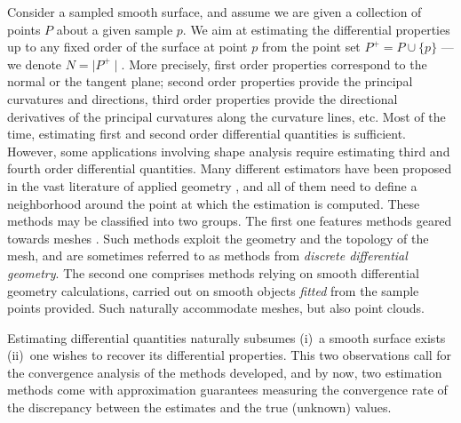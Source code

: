 Consider a sampled smooth surface, and assume we are given a
collection of points $P$ about a given sample $p$. We aim at
estimating the differential properties up to any fixed order of the
surface at point $p$ from the point set $P^+ = P\cup \{ p\}$ ---we
denote $N=\mid P^+\mid$. More precisely, first order properties
correspond to the normal or the tangent plane; second order properties
provide the principal curvatures and directions, third order
properties provide the directional derivatives of the principal
curvatures along the curvature lines, etc.  Most of the time,
estimating first and second order differential quantities is
sufficient.  However, some applications involving shape analysis
require estimating third and fourth order differential quantities.
Many different estimators have been proposed in the vast literature of
applied geometry \cite{cgal:p-smrqt-01}, and all of them need to
define a neighborhood around the point at which the estimation is
computed. These methods may be classified into two groups. The first
one features methods geared towards meshes
\cite{cgal:pp-cdmsc-93,cgal:mdsb-ddgot-02,cgal:csm-rdtnc-03}.
Such methods exploit the geometry and the topology of the mesh, and
are sometimes referred to as methods from {\em discrete differential
geometry}.
The second one comprises methods relying on smooth differential
geometry calculations, carried out on smooth objects {\em fitted} from
the sample points provided. Such naturally accommodate meshes, but also
point clouds.





Estimating differential quantities naturally subsumes (i)\ a smooth
surface exists (ii)\ one wishes to recover its differential
properties. This two observations call for the convergence analysis of
the methods developed, and by now, two estimation methods come with
approximation guarantees measuring the convergence rate of the
discrepancy between the estimates and the true (unknown) values.


